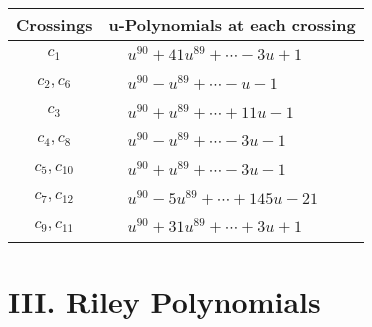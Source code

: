 \documentclass[1p]{elsarticle_modified}
\theoremstyle{definition}
\begin{document}
\begin{tabular}{m{50pt}|m{274pt}}
Crossings & \hspace{64pt}u-Polynomials at each crossing \\
\hline $$\begin{aligned}c_{1}\end{aligned}$$&$\begin{aligned}
&u^{90}+41 u^{89}+\cdots-3 u+1
\end{aligned}$\\
\hline $$\begin{aligned}c_{2},c_{6}\end{aligned}$$&$\begin{aligned}
&u^{90}- u^{89}+\cdots- u-1
\end{aligned}$\\
\hline $$\begin{aligned}c_{3}\end{aligned}$$&$\begin{aligned}
&u^{90}+u^{89}+\cdots+11 u-1
\end{aligned}$\\
\hline $$\begin{aligned}c_{4},c_{8}\end{aligned}$$&$\begin{aligned}
&u^{90}- u^{89}+\cdots-3 u-1
\end{aligned}$\\
\hline $$\begin{aligned}c_{5},c_{10}\end{aligned}$$&$\begin{aligned}
&u^{90}+u^{89}+\cdots-3 u-1
\end{aligned}$\\
\hline $$\begin{aligned}c_{7},c_{12}\end{aligned}$$&$\begin{aligned}
&u^{90}-5 u^{89}+\cdots+145 u-21
\end{aligned}$\\
\hline $$\begin{aligned}c_{9},c_{11}\end{aligned}$$&$\begin{aligned}
&u^{90}+31 u^{89}+\cdots+3 u+1
\end{aligned}$\\
\hline
\end{tabular}\newpage\renewcommand{\arraystretch}{1}
\centering \section*{ III. Riley Polynomials}
\end{document}
